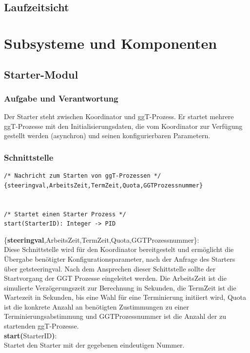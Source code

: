\documentclass{article}
\begin{document}
\subsection{Laufzeitsicht}

\newpage

\section{Subsysteme und Komponenten}

\subsection{Starter-Modul}
\subsubsection{Aufgabe und Verantwortung}
Der Starter steht zwischen Koordinator und ggT-Prozess. Er startet mehrere ggT-Prozesse mit den Initialisierungsdaten,
die vom Koordinator zur Verfügung gestellt werden (asynchron) und seinen konfigurierbaren Parametern.

\subsubsection{Schnittstelle}
\begin{lstlisting}
/* Nachricht zum Starten von ggT-Prozessen */
{steeringval,ArbeitsZeit,TermZeit,Quota,GGTProzessnummer}


/* Startet einen Starter Prozess */
start(StarterID): Integer -> PID
\end{lstlisting}
\{\textbf{steeringval},ArbeitsZeit,TermZeit,Quota,GGTProzessnummer\}:\\
Diese Schnittstelle wird für den Koordinator bereitgestelt und ermöglicht die Übergabe benötigter Konfigurationsparameter,
nach der Anfrage des Starters über getsteeringval.
Nach dem Ansprechen dieser Schittstelle sollte der Startvorgang der GGT Prozesse eingeleitet werden. Die ArbeitsZeit ist die simulierte Verzögerungszeit zur Berechnung in Sekunden, die TermZeit ist die
Wartezeit in Sekunden, bis eine Wahl für eine Terminierung initiiert wird, Quota ist die konkrete Anzahl an
benötigten Zustimmungen zu einer Terminierungsabstimmung und GGTProzessnummer ist die Anzahl der zu startenden
ggT-Prozesse.\\

\textbf{start(}StarterID\textbf{)}:\\
Startet den Starter mit der gegebenen eindeutigen Nummer.\\
\end{document}
